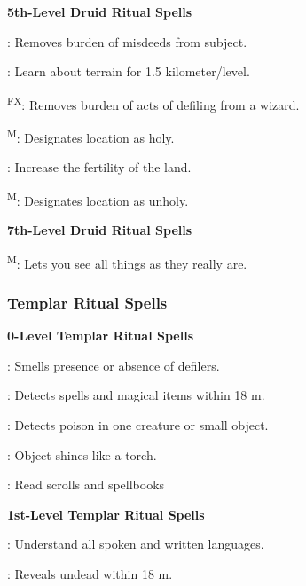 \noindent\textbf{5th-Level Druid Ritual Spells}
\begin{itemize*}
	\item[] : Removes burden of misdeeds from subject.
	\item[] : Learn about terrain for 1.5 kilometer/level.
	\item[] \textsuperscript{FX}: Removes burden of acts of defiling from a wizard.
	\item[] \textsuperscript{M}: Designates location as holy.
	\item[] : Increase the fertility of the land.
	\item[] \textsuperscript{M}: Designates location as unholy.
\end{itemize*}

\noindent\textbf{7th-Level Druid Ritual Spells}
\begin{itemize*}
	\item[] \textsuperscript{M}: Lets you see all things as they really are.
\end{itemize*}

\subsubsection{Templar Ritual Spells}
\noindent\textbf{0-Level Templar Ritual Spells}
\begin{itemize*}
	\item[] : Smells presence or absence of defilers.
	\item[] : Detects spells and magical items within 18 m.
	\item[] : Detects poison in one creature or small object.
	\item[] : Object shines like a torch.
	\item[] : Read scrolls and spellbooks
\end{itemize*}

\noindent\textbf{1st-Level Templar Ritual Spells}
\begin{itemize*}
	\item[] : Understand all spoken and written languages.
	\item[] : Reveals undead within 18 m.
\end{itemize*}

